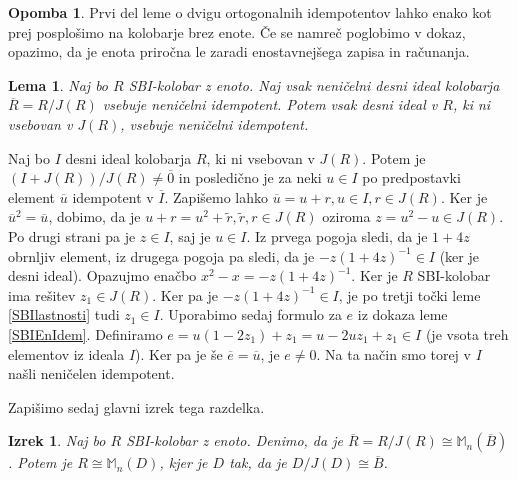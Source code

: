 \documentclass[a4paper, 12pt]{amsart}
\theoremstyle{definition} %
\newtheorem{opomba}[definicija]{Opomba}
\theoremstyle{plain} %
\newtheorem{lema}[definicija]{Lema}
\newtheorem{izrek}[definicija]{Izrek}
\newcommand{\M}{\mathbb M}
\begin{document}
\begin{opomba}
Prvi del leme o dvigu ortogonalnih idempotentov lahko enako kot prej posplošimo na kolobarje brez enote. Če se namreč poglobimo v dokaz, opazimo, da je enota priročna le zaradi enostavnejšega zapisa in računanja. 
\end{opomba}

\begin{lema}
Naj bo $R$ SBI-kolobar z enoto. Naj vsak neničelni desni ideal kolobarja $\overline{R} = R/J(R)$ vsebuje neničelni idempotent. Potem vsak desni ideal v $R$, ki ni vsebovan v $J(R)$, vsebuje neničelni idempotent.
\end{lema}

\proof
Naj bo $I$ desni ideal kolobarja $R$, ki ni vsebovan v $J(R)$. Potem je $(I+J(R))/J(R) \neq \overline{0}$ in posledično je za neki $u\in I$ po predpostavki element $\overline{u}$ idempotent v $\overline{I}$. Zapišemo lahko $\overline{u} = u + r, u\in I, r \in J(R)$. Ker je $\overline{u}^2 = \overline{u}$, dobimo, da je $u+r = u^2 + \tilde{r}, \tilde{r},r\in J(R)$ oziroma $z= u^2 - u\in J(R)$. Po drugi strani pa je $z\in I$, saj je $u\in I$. Iz prvega pogoja sledi, da je $1+4z$ obrnljiv element, iz drugega pogoja pa sledi, da je $-z(1+4z)^{-1}\in I $ (ker je desni ideal). Opazujmo enačbo $x^2 - x = -z(1+4z)^{-1} $. Ker je $R$ SBI-kolobar ima rešitev $z_1 \in J(R)$. Ker pa je $-z(1+4z)^{-1}\in I$, je po tretji točki leme \ref{SBIlastnosti} tudi $z_1\in I$. Uporabimo sedaj formulo za $e$ iz dokaza leme \ref{SBIEnIdem}. Definiramo $e=u(1-2z_1) + z_1 = u - 2uz_1 + z_1\in I$ (je vsota treh elementov iz ideala  $I$). Ker pa je še $\overline{e} = \overline{u}$, je $e\neq 0$. Na ta način smo torej v $I$ našli neničelen idempotent.
\endproof

Zapišimo sedaj glavni izrek tega razdelka.

\begin{izrek}
\label{SBIizrek}
Naj bo $R$ SBI-kolobar z enoto. Denimo, da je $\overline{R}  = R/J(R) \cong \M_n(\overline{B})$. Potem je $R \cong \M_n(D)$, kjer je $D$ tak, da je  $D/J(D) \cong \overline{B}$.
\end{izrek}
\end{document}
